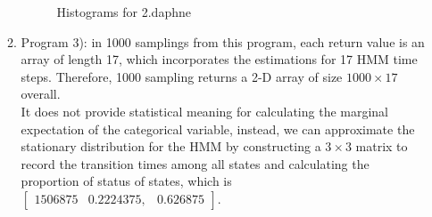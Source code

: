 \documentclass{article}
\begin{document}
\begin{enumerate}
\begin{enumerate}
\begin{figure}[!htp]
{        \label{fig:a}%
        }%
    \hfill%
        \caption{Histograms for 2.daphne}
\end{figure}

\newpage
\item Program 3): in 1000 samplings from this program, each return value is an array of length 17,  which incorporates the estimations for 17 HMM time steps. Therefore, 1000 sampling returns a 2-D array of size $1000\times 17$ overall.\\
It does not provide statistical meaning for calculating the marginal expectation of the categorical variable, instead,  we can approximate the stationary distribution for the HMM by constructing a $3\times 3$ matrix to record the transition times among all states and calculating the proportion of status of states, which is $\begin{bmatrix}
1506875 & 0.2224375, & 0.626875 
\end{bmatrix}$.
\begin{figure}[!htp]
	\centering
    \hfill%
   \hfill%
\end{figure}
\end{enumerate}
\end{enumerate}
\end{document}
